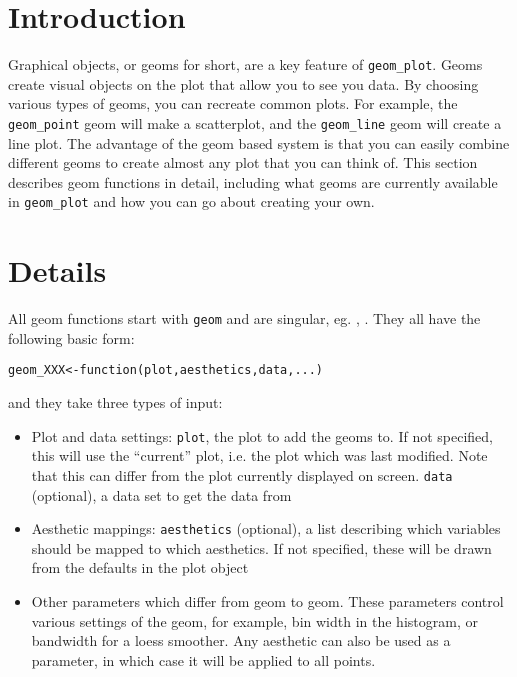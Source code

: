 \section{Introduction}\label{sec:introduction}

Graphical objects, or geoms for short, are a key feature of {\tt geom_plot}.  Geoms create visual objects on the plot that allow you to see you data.  By choosing various types of geoms, you can recreate common plots.  For example, the {\tt geom_point} geom will make a scatterplot, and the {\tt geom_line} geom will create a line plot.  The advantage of the geom based system is that you can easily combine different geoms to create almost any plot that you can think of.  This section describes geom functions in detail, including what geoms are currently available in {\tt geom_plot} and how you can go about creating your own.


\section{Details}\label{sec:details}

All geom functions start with {\tt geom} and are singular, eg. , .  They all have the following basic form:

\begin{alltt}
geom_XXX <- function(plot, aesthetics, data, ...) {}
\end{alltt}

\noindent and they take three types of input:

\begin{itemize}
	\item Plot and data settings: {\tt plot}, the plot to add the geoms to. If not specified, this will use the ``current'' plot, i.e. the plot which was last modified. Note that this can differ from the plot currently displayed on screen.  {\tt data} (optional), a data set to get the data from
	\item Aesthetic mappings: {\tt aesthetics} (optional), a list describing which variables should be mapped to which aesthetics.  If not specified, these will be drawn from the defaults in the plot object
	\item Other parameters which differ from geom to geom.  These parameters control various settings of the geom, for example, bin width in the histogram, or bandwidth for a loess smoother.  Any aesthetic can also be used as a parameter, in which case it will be applied to all points.
\end{itemize}

